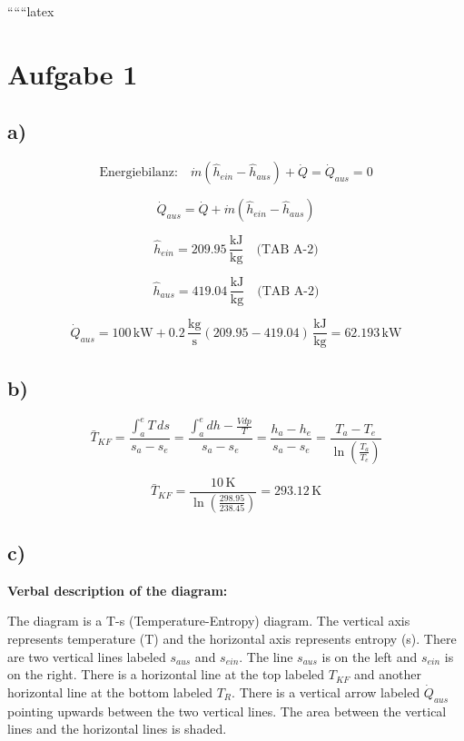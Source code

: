 
``````latex


\section*{Aufgabe 1}

\subsection*{a)}

\[
\text{Energiebilanz:} \quad \dot{m} (\hat{h}_{ein} - \hat{h}_{aus}) + \dot{Q} = \dot{Q}_{aus} = 0
\]

\[
\dot{Q}_{aus} = \dot{Q} + \dot{m} (\hat{h}_{ein} - \hat{h}_{aus})
\]

\[
\hat{h}_{ein} = 209.95 \, \frac{\text{kJ}}{\text{kg}} \quad \text{(TAB A-2)}
\]

\[
\hat{h}_{aus} = 419.04 \, \frac{\text{kJ}}{\text{kg}} \quad \text{(TAB A-2)}
\]

\[
\dot{Q}_{aus} = 100 \, \text{kW} + 0.2 \, \frac{\text{kg}}{\text{s}} (209.95 - 419.04) \, \frac{\text{kJ}}{\text{kg}} = 62.193 \, \text{kW}
\]

\subsection*{b)}

\[
\bar{T}_{KF} = \frac{\int_{a}^{e} T \, ds}{s_a - s_e} = \frac{\int_{a}^{e} dh - \frac{V dp}{T}}{s_a - s_e} = \frac{h_a - h_e}{s_a - s_e} = \frac{T_a - T_e}{\ln \left( \frac{T_a}{T_e} \right)}
\]

\[
\bar{T}_{KF} = \frac{10 \, \text{K}}{\ln \left( \frac{298.95}{238.45} \right)} = 293.12 \, \text{K}
\]

\subsection*{c)}

\textbf{Verbal description of the diagram:}

The diagram is a T-s (Temperature-Entropy) diagram. The vertical axis represents temperature (T) and the horizontal axis represents entropy (s). There are two vertical lines labeled \( s_{aus} \) and \( s_{ein} \). The line \( s_{aus} \) is on the left and \( s_{ein} \) is on the right. There is a horizontal line at the top labeled \( T_{KF} \) and another horizontal line at the bottom labeled \( T_R \). There is a vertical arrow labeled \( \dot{Q}_{aus} \) pointing upwards between the two vertical lines. The area between the vertical lines and the horizontal lines is shaded.

